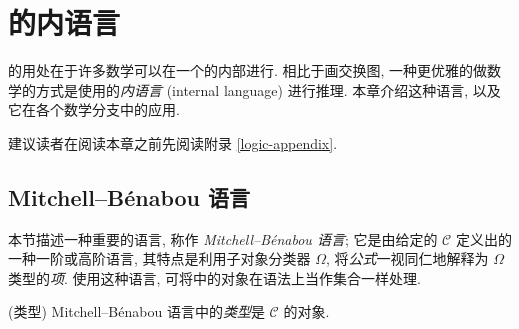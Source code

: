 \chapter{\topos{}的内语言}


\minitoc

\topos{}的用处在于许多数学可以在一个\topos{}的内部进行. 相比于画交换图, 一种更优雅的做数学的方式是使用\topos{}的\emph{内语言} (internal language) 进行推理. 本章介绍这种语言, 以及它在各个数学分支中的应用.

\begin{remark}
	{}
	建议读者在阅读本章之前先阅读附录 \ref{logic-appendix}.
\end{remark}

\section{Mitchell--B\'enabou 语言}

\label{Mitchell--Benabou-language}

\label{logical-functor-internal}

本节描述一种重要的语言, 称作 \emph{Mitchell--B\'enabou 语言}; 它是由给定的\topos{} $\mathcal C$ 定义出的一种一阶或高阶语言, 其特点是利用子对象分类器 $\Omega$, 将\emph{公式}一视同仁地解释为 $\Omega$ 类型的\emph{项}. 使用这种语言, 可将\topos{}中的对象在语法上当作集合一样处理.

\begin{definition}
    {(类型)}
    Mitchell--B\'enabou 语言中的\emph{类型}是 $\mathcal C$ 的对象.
\end{definition}




